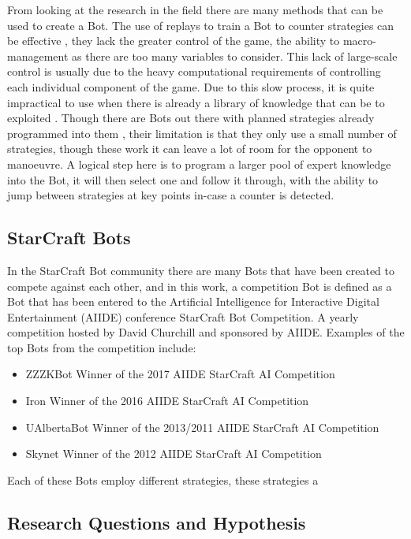 \documentclass[journal]{IEEEtran}
\begin{document}
	From looking at the research in the field there are many methods that can be used to create a Bot. The use of replays to train a Bot to counter strategies can be effective \cite{Bayesian}, they lack the greater control of the game, the ability to macro-management as there are too many variables to consider. This lack of large-scale control is usually due to the heavy computational requirements of controlling each individual component of the game.  Due to this slow process, it is quite impractical to use when there is already a library of knowledge that can be to exploited \cite{Liquid}. Though there are Bots out there with planned strategies already programmed into them \cite{ZZZK,Fuzzy}, their limitation is that they only use a small number of strategies, though these work it can leave a lot of room for the opponent to manoeuvre. A logical step here is to program a larger pool of expert knowledge into the Bot, it will then select one and follow it through, with the ability to jump between strategies at key points in-case a counter is detected. 
	
	\subsection{StarCraft Bots}
	In the StarCraft Bot community there are many Bots that have been created to compete against each other, and in this work, a competition Bot is defined as a Bot that has been entered to the Artificial Intelligence for Interactive Digital Entertainment (AIIDE) conference StarCraft Bot Competition. A yearly competition hosted by David Churchill and sponsored by AIIDE. Examples of the top Bots from the competition include:
	\begin{itemize}
		\item ZZZKBot Winner of the 2017 AIIDE StarCraft AI Competition \cite{ZZZK} 
		\item Iron Winner of the 2016 AIIDE StarCraft AI Competition \cite{Iron}
		\item UAlbertaBot Winner of the 2013/2011 AIIDE StarCraft AI Competition \cite{UAlberta}
		\item Skynet Winner of the 2012 AIIDE StarCraft AI Competition \cite{Skynet}
	\end{itemize}
	
	Each of these Bots employ different strategies, these strategies a
	
	\subsection{Research Questions and Hypothesis}
	
\end{document}

